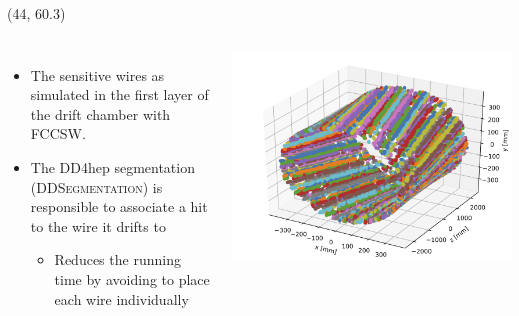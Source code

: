 \documentclass[final,xcolor={dvipsnames,svgnames,x11names,table}]{beamer}
\begin{document}
\begin{frame}
\begin{textblock}{43}
\begin{tcolorbox}[title=The drift chamber]
\begin{columns}
    \end{columns}

  \vspace{0.5cm}

  \end{tcolorbox}
\end{textblock}


\begin{textblock}{39.5}(44, 60.3)
  \begin{tcolorbox}[title=The simulation of the drift chamber with FCCSW]

    \begin{columns}
      \begin{itemize}
        \item The sensitive wires as simulated in the first layer of the drift chamber with FCCSW. \vspace{0.5cm}
        \item The DD4hep segmentation (\textsc{DDSegmentation}) is responsible to associate a hit to the wire it drifts to \vspace{0.2cm}
          \begin{itemize}
            \item Reduces the running time by avoiding to place each wire individually
          \end{itemize}
      \end{itemize}

        \centering
        \includegraphics[width=\textwidth]{Figures/allHits}


\end{columns}
\end{tcolorbox}
\end{textblock}
\end{frame}
\end{document}
